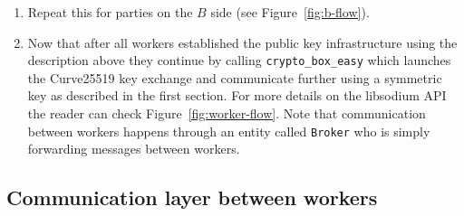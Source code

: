\begin{enumerate}
  \item Repeat this for parties on the $B$ side (see Figure~\ref{fig:b-flow}).

  \item Now that after all workers established the public key infrastructure
  using the description above they continue by calling \verb|crypto_box_easy|
  which launches the Curve25519 key exchange and communicate further using a
  symmetric key as described in the first section. For more details on the libsodium API
  the reader can check Figure~\ref{fig:worker-flow}. Note that communication
  between workers happens through an entity called \verb|Broker| who is
  simply forwarding messages between workers.

\end{enumerate}

\subsection{Communication layer between workers}




